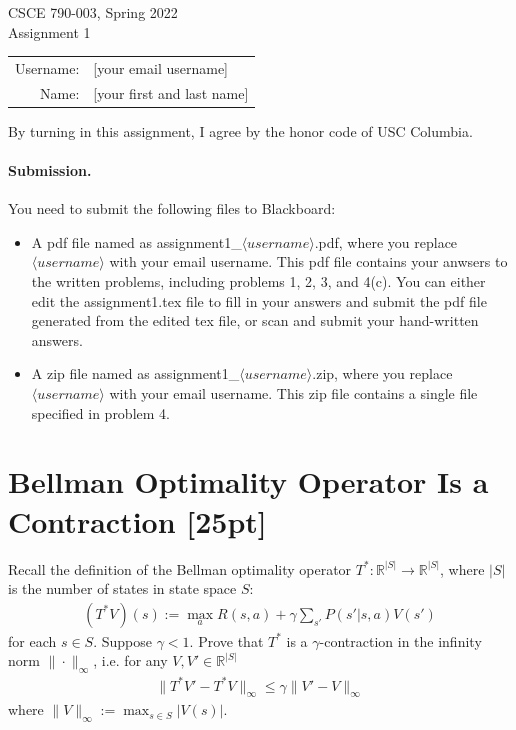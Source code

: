 \documentclass[11pt]{article}
\theoremstyle{case}
\newcommand{\norm}[2][2]{\| #2\|}
\begin{document}
\begin{center}
{\Large CSCE 790-003, Spring 2022 \\ Assignment 1}

\begin{tabular}{rl}
Username: & [your email username] \\
Name: & [your first and last name] \\
\end{tabular}
\end{center}
By turning in this assignment, I agree by the honor code of USC Columbia.

\paragraph{Submission.}
You need to submit the following files to Blackboard:
\begin{itemize}
    \item A pdf file named as assignment1\_$\langle username \rangle$.pdf, where you replace $\langle username \rangle$ with your email username. This pdf file contains your anwsers to the written problems, including problems 1, 2, 3, and 4(c). 
    You can either edit the assignment1.tex file to fill in your answers and submit the pdf file generated from the edited tex file, or scan and submit your hand-written answers.
    \item A zip file named as assignment1\_$\langle username \rangle$.zip, where you replace $\langle username \rangle$ with your email username. This zip file contains a single file specified in problem 4.
\end{itemize}

\section{Bellman Optimality Operator Is a Contraction [25pt]}
Recall the definition of the Bellman optimality operator $T^*: \mathbb{R}^{|S|} \to \mathbb{R}^{|S|}$, where $|S|$ is the number of states in state space $S$:
\begin{align*}
    (T^*V)(s) := \max_a R(s,a) + \gamma \sum_{s'}P(s'|s,a)V(s')
\end{align*}
for each $s\in S$.
Suppose $\gamma<1$.
Prove that $T^*$ is a $\gamma$-contraction in the infinity norm $\norm{\cdot}_\infty$, i.e. for any $V, V'\in\mathbb{R}^{|S|}$
\begin{align*}
    \norm{T^*V'-T^*V}_\infty\leq\gamma\norm{V'-V}_\infty
\end{align*}
where $\norm{V}_\infty := \max_{s \in S} |V(s)| $.
\end{document}
